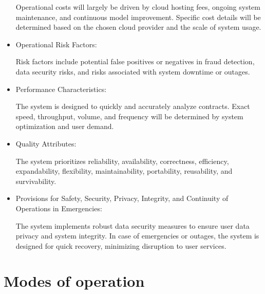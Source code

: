 \begin{itemize}
Operational costs will largely be driven by cloud hosting fees, ongoing system maintenance, and continuous model improvement. Specific cost details will be determined based on the chosen cloud provider and the scale of system usage.

\item Operational Risk Factors:

Risk factors include potential false positives or negatives in fraud detection, data security risks, and risks associated with system downtime or outages.

\item  Performance Characteristics:

The system is designed to quickly and accurately analyze contracts. Exact speed, throughput, volume, and frequency will be determined by system optimization and user demand.

\item  Quality Attributes:

The system prioritizes reliability, availability, correctness, efficiency, expandability, flexibility, maintainability, portability, reusability, and survivability.

\item Provisions for Safety, Security, Privacy, Integrity, and Continuity of Operations in Emergencies:

The system implements robust data security measures to ensure user data privacy and system integrity. In case of emergencies or outages, the system is designed for quick recovery, minimizing disruption to user services.


\end{itemize}



\section{Modes of operation \label{Section::Modes of operation proposed}}

